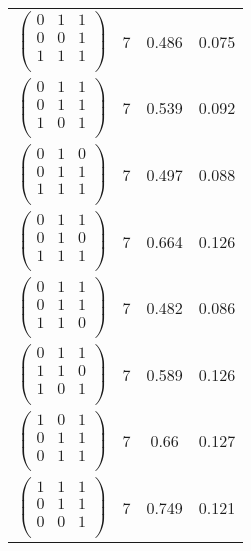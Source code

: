 \documentclass{amsart}
\theoremstyle{definition}
\theoremstyle{remark}
\numberwithin{equation}{section}
\begin{document}
\begin{longtable}{ c || c | c | c }
$\begin{pmatrix}
0 & 1 & 1\\
0 & 0 & 1\\
1 & 1 & 1\\
\end{pmatrix}$ & 7 & 0.486 & 0.075\\
$\begin{pmatrix}
0 & 1 & 1\\
0 & 1 & 1\\
1 & 0 & 1\\
\end{pmatrix}$ & 7 & 0.539 & 0.092\\
$\begin{pmatrix}
0 & 1 & 0\\
0 & 1 & 1\\
1 & 1 & 1\\
\end{pmatrix}$ & 7 & 0.497 & 0.088\\
$\begin{pmatrix}
0 & 1 & 1\\
0 & 1 & 0\\
1 & 1 & 1\\
\end{pmatrix}$ & 7 & 0.664 & 0.126\\
$\begin{pmatrix}
0 & 1 & 1\\
0 & 1 & 1\\
1 & 1 & 0\\
\end{pmatrix}$ & 7 & 0.482 & 0.086\\
$\begin{pmatrix}
0 & 1 & 1\\
1 & 1 & 0\\
1 & 0 & 1\\
\end{pmatrix}$ & 7 & 0.589 & 0.126\\
$\begin{pmatrix}
1 & 0 & 1\\
0 & 1 & 1\\
0 & 1 & 1\\
\end{pmatrix}$ & 7 & 0.66 & 0.127\\
$\begin{pmatrix}
1 & 1 & 1\\
0 & 1 & 1\\
0 & 0 & 1\\
\end{pmatrix}$ & 7 & 0.749 & 0.121\\

\end{longtable}
\end{document}
